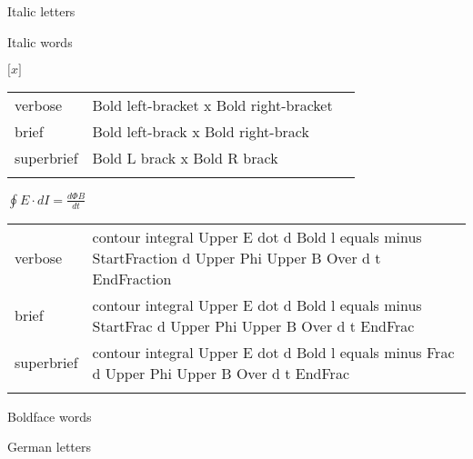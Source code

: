 \R
Italic letters

\R
Italic words

\R
\E $\mathbf{[}x\mathbf{]}$
\begin{longtable}[c]{@{}lll@{}}
\toprule\addlinespace
verbose & Bold left-bracket x Bold right-bracket &

\\\addlinespace
brief & Bold left-brack x Bold right-brack &

\\\addlinespace
superbrief & Bold L brack x Bold R brack &

\\\addlinespace
\bottomrule
\end{longtable}


\E $\oint E\cdot dI = \frac{d\Phi B}{dt}$
\begin{longtable}[c]{@{}ll@{}}
\toprule\addlinespace
verbose & contour integral Upper E dot d Bold l equals minus
StartFraction d Upper Phi Upper B Over d t EndFraction
\\\addlinespace
brief & contour integral Upper E dot d Bold l equals minus StartFrac d
Upper Phi Upper B Over d t EndFrac
\\\addlinespace
superbrief & contour integral Upper E dot d Bold l equals minus Frac d
Upper Phi Upper B Over d t EndFrac
\\\addlinespace
\bottomrule
\end{longtable}


\R
Boldface words

\R
German letters


